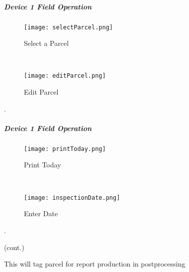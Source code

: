  \clearpage


 \subparagraph{Device 1 Field Operation}

 \begin{wrapfigure}{r}{0.5\textwidth}
 \centering
     \texttt{[image: selectParcel.png]}
 \vspace{-.1in}
 
 \caption {Select a Parcel}
 \vspace{.1in}

 \HRule \\[.4cm] %
 \vspace{.1in}

 \centering
     \texttt{[image: editParcel.png]}
     \vspace{-.1in}
     
 \caption{Edit Parcel}
 \end{wrapfigure}
 .
 \vspace{2in}

 \vspace{3.5in}

 \clearpage
 \subparagraph*{Device 1 Field Operation}
 \begin{wrapfigure}{r}{0.6\textwidth}
 \centering
     \texttt{[image: printToday.png]}
 \caption {Print Today}
 \vspace{.05in}

 \HRule \\[.4cm] %
 \vspace{.05in}

     \texttt{[image: inspectionDate.png]}
 \caption{Enter Date}
 
 \end{wrapfigure}
 .

 {\footnotesize (cont.)}
 \vspace{.8in}

 \vspace{.5in}
 
 \noindent This will tag parcel for report production in postprocessing
 \vspace{4in}



 \clearpage



